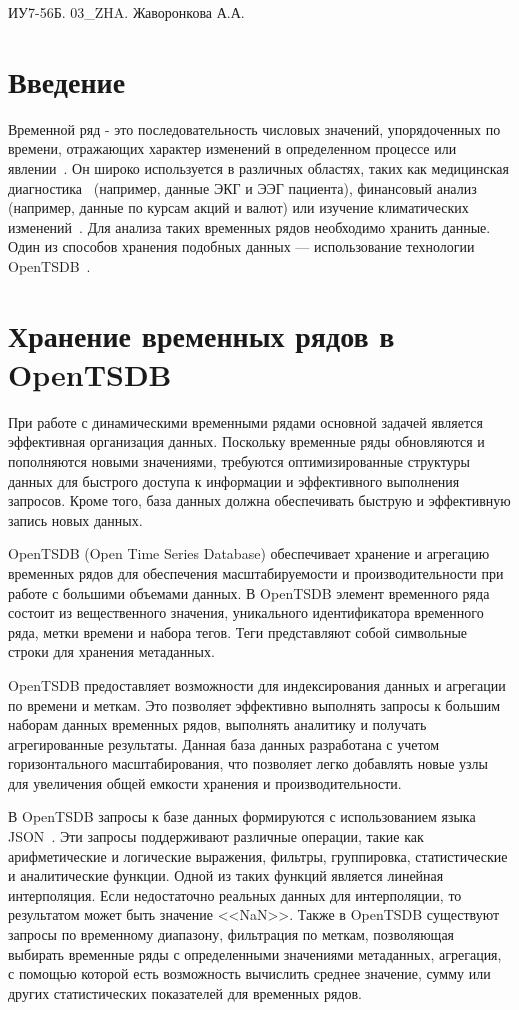 \documentclass[a4paper,14pt, unknownkeysallowed]{extreport}
\begin{document}
	ИУ7-56Б. 03\_ZHA. Жаворонкова А.А.
	
	\section*{Введение}
	
	Временной ряд - это последовательность числовых значений, упорядоченных по времени, отражающих характер изменений в определенном процессе или явлении~\cite{5}. 
	Он широко используется в различных областях, таких как медицинская диагностика~\cite{6} (например, данные ЭКГ и ЭЭГ пациента), финансовый анализ~\cite{7} (например, данные по курсам акций и валют) или изучение климатических изменений~\cite{8}. 
	Для анализа таких временных рядов необходимо хранить данные. 
	Один из способов хранения подобных данных --- использование технологии OpenTSDB~\cite{9}.
	
	\section*{Хранение временных рядов в OpenTSDB}
	
	При работе с динамическими временными рядами основной задачей является эффективная организация данных. 
	Поскольку временные ряды обновляются и пополняются новыми значениями, требуются оптимизированные структуры данных для быстрого доступа к информации и эффективного выполнения запросов. 
	Кроме того, база данных должна обеспечивать быструю и эффективную запись новых данных.
	
	OpenTSDB (Open Time Series Database) обеспечивает хранение и агрегацию временных рядов для обеспечения масштабируемости и производительности при работе с большими объемами данных. В OpenTSDB элемент временного ряда состоит из вещественного значения, уникального идентификатора временного ряда, метки времени и набора тегов. 
	Теги представляют собой символьные строки для хранения метаданных.
	
	OpenTSDB предоставляет возможности для индексирования данных и агрегации по времени и меткам. Это позволяет эффективно выполнять запросы к большим наборам данных временных рядов, выполнять аналитику и получать агрегированные результаты. Данная база данных разработана с учетом горизонтального масштабирования, что позволяет легко добавлять новые узлы для увеличения общей емкости хранения и производительности.
	
	В OpenTSDB запросы к базе данных формируются с использованием языка JSON~\cite{10}. 
	Эти запросы поддерживают различные операции, такие как арифметические и логические выражения, фильтры, группировка, статистические и аналитические функции. 
	Одной из таких функций является линейная интерполяция. 
	Если недостаточно реальных данных для интерполяции, то результатом может быть значение <<NaN>>. 
	Также в OpenTSDB существуют запросы по временному диапазону, фильтрация по меткам, позволяющая выбирать временные ряды с определенными значениями метаданных, агрегация, с помощью которой есть возможность вычислить среднее значение, сумму или других статистических показателей для временных рядов.
	
\end{document}
